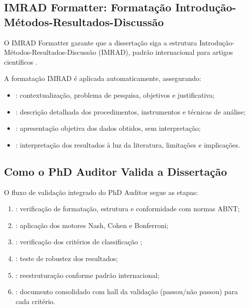 \subsection{IMRAD Formatter: Formatação Introdução-Métodos-Resultados-Discussão}

O IMRAD Formatter garante que a dissertação siga a estrutura Introdução-
Métodos-Resultados-Discussão (IMRAD), padrão internacional para artigos
científicos \cite{sommerville2011engenharia}.

A formatação IMRAD é aplicada automaticamente, assegurando:

\begin{itemize}
\item {}: contextualização, problema de pesquisa,
      objetivos e justificativa;
\item {}: descrição detalhada dos procedimentos,
      instrumentos e técnicas de análise;
\item {}: apresentação objetiva dos dados obtidos, sem
      interpretação;
\item {}: interpretação dos resultados à luz da literatura,
      limitações e implicações.
\end{itemize}

\subsection{Como o PhD Auditor Valida a Dissertação}

O fluxo de validação integrado do PhD Auditor segue as etapas:

\begin{enumerate}
\item {}: verificação de formatação, estrutura e
      conformidade com normas ABNT;
\item {}: aplicação dos motores Nash, Cohen e
      Bonferroni;
\item {}: verificação dos critérios de classificação
      \qualisA{};
\item {}: teste de robustez dos resultados;
\item {}: reestruturação conforme padrão
      internacional;
\item {}: documento consolidado com hall da
      validação (passou/não passou) para cada critério.
\end{enumerate}

